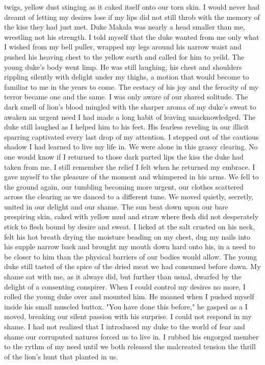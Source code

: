 \documentclass{article}
\begin{document}
twigs, yellow dust stinging as it caked itself onto our torn skin. I would never had dreamt of letting my desires lose if my lips did not still throb with the memory of the kiss they had just met. Duke Makala was nearly a head smaller than me, wrestling not his strength. I told myself that the duke wanted from me only what I wished from my bell puller, wrapped my legs around his narrow waist and pushed his heaving chest to the yellow earth and called for him to yeild. The young duke's body went limp. He was still laughing, his chest and shoulders rippling silently with delight under my thighs, a motion that would become to familiar to me in the years to come. The ecstacy of his joy and the ferocity of my terror became one and the same. I was only aware of our shared solitude. The dark smell of lion's blood mingled with the sharper aroma of my duke's sweat to awaken an urgent need I had made a long habit of leaving unacknowledged. The duke still laughed as I helped him to his feet. His fearless reveling in our illicit sparring captivated every last drop of my attention. I stepped out of the cautious shadow I had learned to live my life in. We were alone in this grassy clearing. No one would know if I returned to those dark parted lips the kiss the duke had taken from me. I still remember the relief I felt when he returned my embrace. I gave myself to the pleasure of the moment and whimpered in his arms. We fell to the ground again, our tumbling becoming more urgent, our clothes scattered across the clearing as we danced to a different tune. We moved quietly, secretly, united in our delight and our shame. The sun beat down upon our bare prespiring skin, caked with yellow mud and straw where flesh did not desperately stick to flesh bound by desire and  sweat. I licked at the salt crusted on his neck, felt his hot breath drying the moisture beading on my chest, dug my nails into his supple narrow back and brought my mouth down hard onto his, in a need to be closer to him than the physical barriers of our bodies would allow. The young duke still tasted of the spice of the dried meat we had consumed before dawn. My shame sat with me, as it always did, but further than usual, dwarfed by the delight of a consenting conspirer. When I could control my desires no more, I rolled the young duke over and mounted him. He moaned when I pushed myself inside his small muscled buttox. "You have done this before," he gasped as a I moved, breaking our silent passion with his surprise. I could not respond in my shame. I had not realized that I introduced my duke to the world of fear and shame our corruputed natures forced us to live in. I rubbed his engorged member to the rythm of my need until we both released the malcreated tension the thrill of the lion's hunt that planted in us.
\end{document}
